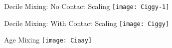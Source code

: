 \begin{frame}{Decile Mixing: No Contact Scaling}
  \centering\texttt{[image: Ciggy-1]}
\end{frame}
\begin{frame}{Decile Mixing: With Contact Scaling}
  \centering\texttt{[image: Ciggy]}
\end{frame}
\begin{frame}{Age Mixing}
  \centering\texttt{[image: Ciaay]}
\end{frame}